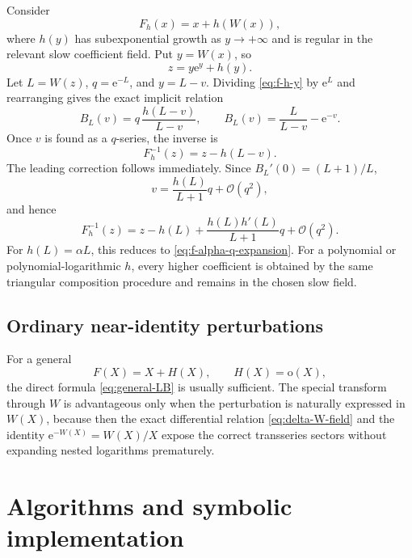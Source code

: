 \documentclass[11pt,a4paper]{article}
\numberwithin{equation}{section}
\theoremstyle{definition}
\theoremstyle{remark}
\newcommand{\e}{\mathrm e}
\newcommand{\Ord}{\mathcal O}
\newcommand{\littleo}{\mathrm o}
\begin{document}
Consider
\begin{equation}\label{eq:f-h}
  F_h(x)=x+h(W(x)),
\end{equation}
where \(h(y)\) has subexponential growth as \(y\to+\infty\) and is regular
in the relevant slow coefficient field.  Put \(y=W(x)\), so
\begin{equation}\label{eq:f-h-y}
  z=y\e^y+h(y).
\end{equation}
Let \(L=W(z)\), \(q=\e^{-L}\), and \(y=L-v\).  Dividing
\eqref{eq:f-h-y} by \(\e^L\) and rearranging gives the exact implicit
relation
\begin{equation}\label{eq:f-h-B}
  B_L(v)=q\,\frac{h(L-v)}{L-v},
  \qquad
  B_L(v)=\frac{L}{L-v}-\e^{-v}.
\end{equation}
Once \(v\) is found as a \(q\)-series, the inverse is
\begin{equation}\label{eq:f-h-inverse}
  F_h^{-1}(z)=z-h(L-v).
\end{equation}
The leading correction follows immediately.  Since
\(B_L'(0)=(L+1)/L\),
\begin{equation}\label{eq:f-h-v-leading}
  v=\frac{h(L)}{L+1}q+\Ord(q^2),
\end{equation}
and hence
\begin{equation}\label{eq:f-h-leading-inverse}
  F_h^{-1}(z)
  =z-h(L)+\frac{h(L)h'(L)}{L+1}q+\Ord(q^2).
\end{equation}
For \(h(L)=\alpha L\), this reduces to
\eqref{eq:f-alpha-q-expansion}.  For a polynomial or polynomial-logarithmic
\(h\), every higher coefficient is obtained by the same triangular
composition procedure and remains in the chosen slow field.

\subsection{Ordinary near-identity perturbations}

For a general
\begin{equation}\label{eq:F-general-H}
  F(X)=X+H(X),
  \qquad H(X)=\littleo(X),
\end{equation}
the direct formula \eqref{eq:general-LB} is usually sufficient.  The
special transform through \(W\) is advantageous only when the perturbation
is naturally expressed in \(W(X)\), because then the exact differential
relation \eqref{eq:delta-W-field} and the identity
\(\e^{-W(X)}=W(X)/X\) expose the correct transseries sectors without
expanding nested logarithms prematurely.

\section{Algorithms and symbolic implementation}
\end{document}
